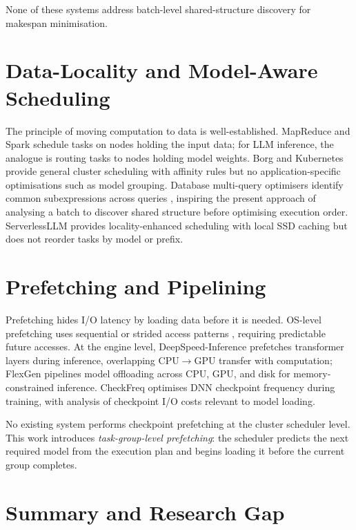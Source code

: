 \documentclass[logo,bsc,singlespacing,parskip,online]{infthesis}
\begin{document}
None of these systems address batch-level shared-structure discovery for makespan minimisation.

\section{Data-Locality and Model-Aware Scheduling}

The principle of moving computation to data is well-established. MapReduce \citep{dean2008mapreduce} and Spark \citep{zaharia2010spark} schedule tasks on nodes holding the input data; for LLM inference, the analogue is routing tasks to nodes holding model weights. Borg \citep{verma2015large} and Kubernetes \citep{kubernetes2024} provide general cluster scheduling with affinity rules but no application-specific optimisations such as model grouping. Database multi-query optimisers identify common subexpressions across queries \citep{sellis1988multiple}, inspiring the present approach of analysing a batch to discover shared structure before optimising execution order. ServerlessLLM \citep{fu2024serverlessllm} provides locality-enhanced scheduling with local SSD caching but does not reorder tasks by model or prefix.

\section{Prefetching and Pipelining}

Prefetching hides I/O latency by loading data before it is needed. OS-level prefetching uses sequential or strided access patterns \citep{patterson2013computer}, requiring predictable future accesses. At the engine level, DeepSpeed-Inference \citep{aminabadi2022deepspeed} prefetches transformer layers during inference, overlapping CPU$\rightarrow$GPU transfer with computation; FlexGen \citep{sheng2023flexgen} pipelines model offloading across CPU, GPU, and disk for memory-constrained inference. CheckFreq \citep{mohan2021checkfreq} optimises DNN checkpoint frequency during training, with analysis of checkpoint I/O costs relevant to model loading.

No existing system performs checkpoint prefetching at the cluster scheduler level. This work introduces \textit{task-group-level prefetching}: the scheduler predicts the next required model from the execution plan and begins loading it before the current group completes.

\section{Summary and Research Gap}
\end{document}
